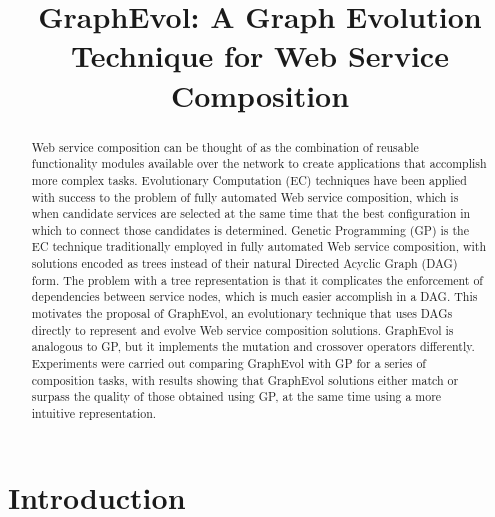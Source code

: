 \documentclass{article}
\title{GraphEvol: A Graph Evolution Technique for Web Service Composition}
\begin{document}
\maketitle

\begin{abstract}
  Web service composition can be thought of as the combination of reusable functionality modules available over the network to
  create applications that accomplish more complex tasks. Evolutionary Computation (EC) techniques have been applied with success
  to the problem of fully automated Web service composition, which is when candidate services are selected at the same time that the best configuration in which to connect those candidates is determined.
  Genetic Programming (GP) is the EC technique traditionally employed in fully automated Web service composition, with
  solutions encoded as trees instead of their natural Directed Acyclic Graph (DAG) form. The problem with a tree representation is that it complicates
  the enforcement of dependencies between service nodes, which is much easier accomplish in a DAG. This motivates the proposal of
  GraphEvol, an evolutionary technique that uses DAGs directly to represent and evolve Web service composition solutions. GraphEvol is analogous to GP, but it
  implements the mutation and crossover operators differently. Experiments were carried out comparing GraphEvol with GP
  for a series of composition tasks, with results showing that GraphEvol solutions either match or surpass the quality of those 
  obtained using GP, at the same time using a more intuitive representation.
\end{abstract}

\section{Introduction}
\end{document}

